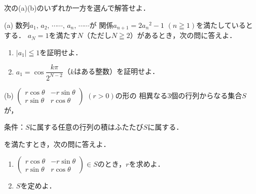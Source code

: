 \documentclass[../../main.tex]{subfiles}
\begin{document}
次の(a)(b)のいずれか一方を選んで解答せよ．

{ (a)}
数列$a_1, \, a_2, \, \cdots\cdots, \, a_n, \, \cdots\cdots$が
関係$a_{n+1}=2{a_n}^2-1$ $(n\geqq1)$を満たしているとする．
$a_N=1$を満たす$N$（ただし$N\geqq2$）があるとき，次の問に答えよ．
\begin{enumerate}
  \item $|a_1|\leqq1$を証明せよ．
  \item $\displaystyle a_1=\cos\dfrac{k\pi}{2^{N-2}}$（$k$はある整数）を証明せよ．
\end{enumerate}

{ (b)}
$
\begin{pmatrix} r\cos\theta & -r\sin\theta \\
  r\sin\theta & r\cos\theta
\end{pmatrix}$ $(r>0)$の形の
相異なる3個の行列からなる集合$S$が，

条件：$S$に属する任意の行列の積はふたたび$S$に属する．

を満たすとき，次の問に答えよ．
\begin{enumerate}
  \item $
    \begin{pmatrix} r\cos\theta & -r\sin\theta \\
      r\sin\theta & r\cos\theta
    \end{pmatrix} \in S$のとき，$r$を求めよ．
  \item $S$を定めよ．
\end{enumerate}
\end{document}
